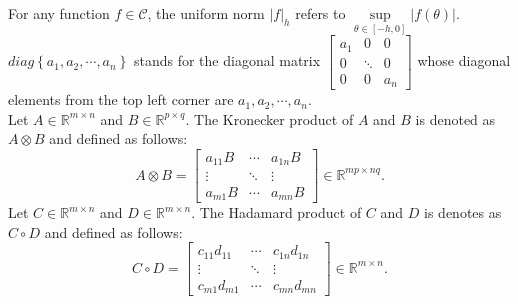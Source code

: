 \documentclass[journal]{IEEEtran}
\begin{document}
\begin{itemize}
For any function $f \in \mathcal{C}$, the uniform norm $|f{|_h}$ refers to $\mathop {\sup }\limits_{\theta  \in [ - h,0]} |f(\theta )|$. \\
$diag\left\{ {{a_1},{a_2}, \cdots ,{a_n}} \right\}$ stands for the diagonal matrix $\left[ {\begin{array}{*{20}{c}}
  {{a_1}} & 0      & 0       \\
  0       & \ddots & 0       \\
  0       & 0      & {{a_n}}
\end{array}} \right]$ whose diagonal elements from the top left corner are ${a_1},{a_2}, \cdots ,{a_n}$.\\
Let $A \in {\mathbb{R}^{m \times n}}$ and $B \in {\mathbb{R}^{p \times q}}$. The Kronecker product of $A$ and $B$ is denoted as $A \otimes B$ and defined as follows:
\begin{equation*}
A \otimes B = \left[ {\begin{array}{*{20}{c}}
  {{a_{11}}B} & \cdots & {{a_{1n}}B} \\
  \vdots      & \ddots & \vdots      \\
  {{a_{m1}}B} & \cdots & {{a_{mn}}B}
\end{array}} \right] \in {\mathbb{R}^{mp \times nq}}.
\end{equation*}
Let $C \in {\mathbb{R}^{m \times n}}$ and $D \in {\mathbb{R}^{m \times n}}$. The Hadamard product of $C$ and $D$ is denotes as $C \circ D$ and defined as follows:
\begin{equation*}
C \circ D = \left[ {\begin{array}{*{20}{c}}
  {{c_{11}}{d_{11}}} & \cdots & {{c_{1n}}{d_{1n}}} \\
  \vdots             & \ddots & \vdots             \\
  {{c_{m1}}{d_{m1}}} & \cdots & {{c_{mn}}{d_{mn}}}
\end{array}} \right] \in {\mathbb{R}^{m \times n}}.
\end{equation*}
\end{itemize}
\end{document}
